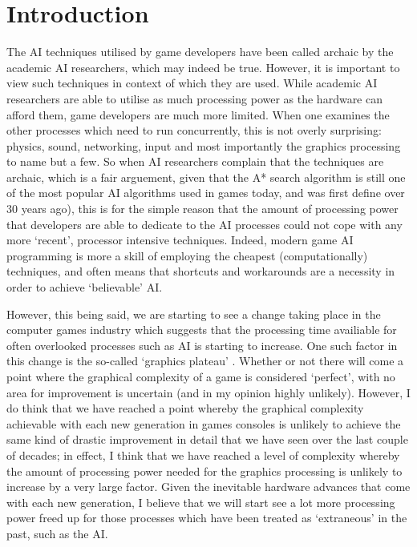 \documentclass[a4paper,oneside]{report}
\begin{document}
%
%

\chapter{Introduction}

The AI techniques utilised by game developers have been called archaic by the academic AI researchers, which may indeed be true. However, it is important to view such techniques in context of which they are used. While academic AI researchers are able to utilise as much processing power as the hardware can afford them, game developers are much more limited. When one examines the other processes which need to run concurrently, this is not overly surprising: physics, sound, networking, input and most importantly the graphics processing to name but a few. So when AI researchers complain that the techniques are archaic, which is a fair arguement, given that the A* search algorithm is still one of the most popular AI algorithms used in games today, and was first define over 30 years ago), this is for the simple reason that the amount of processing power that developers are able to dedicate to the AI processes could not cope with any more `recent', processor intensive techniques. Indeed, modern game AI programming is more a skill of employing the cheapest (computationally) techniques, and often means that shortcuts and workarounds are a necessity in order to achieve `believable' AI. 

However, this being said, we are starting to see a change taking place in the computer games industry which suggests that the processing time availiable for often overlooked processes such as AI is starting to increase. One such factor in this change is the so-called `graphics plateau' \cite{Sheffield:2008fk}. Whether or not there will come a point where the graphical complexity of a game is considered `perfect', with no area for improvement is uncertain (and in my opinion highly unlikely). However, I do think that we have reached a point whereby the graphical complexity achievable with each new generation in games consoles is unlikely to achieve the same kind of drastic improvement in detail that we have seen over the last couple of decades; in effect, I think that we have reached a level of complexity whereby the amount of processing power needed for the graphics processing is unlikely to increase by a very large factor. Given the inevitable hardware advances that come with each new generation, I believe that we will start see a lot more processing power freed up for those processes which have been treated as `extraneous' in the past, such as the AI. 
\end{document}
